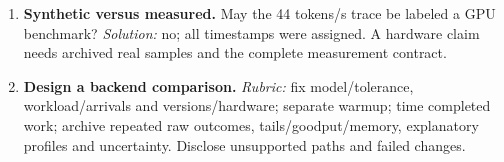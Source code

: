 \begin{enumerate}
$1.25\times$ and 20\% reduction. \emph{Solution:} divide old time by new for
speedup, divide saved time by old time for fractional reduction.
\item \textbf{Synthetic versus measured.} May the 44 tokens/s trace be labeled
a GPU benchmark? \emph{Solution:} no; all timestamps were assigned. A hardware
claim needs archived real samples and the complete measurement contract.
\item \textbf{Design a backend comparison.} \emph{Rubric:} fix model/tolerance,
workload/arrivals and versions/hardware; separate warmup; time completed work;
archive repeated raw outcomes, tails/goodput/memory, explanatory profiles and
uncertainty. Disclose unsupported paths and failed changes.
\end{enumerate}

